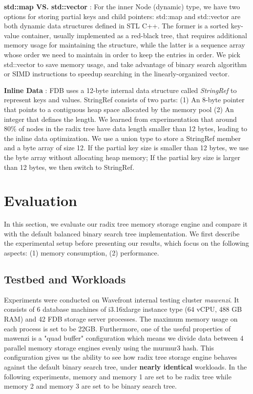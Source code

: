 \documentclass[sigplan,screen,nonacm]{acmart}
\begin{document}
\textbf {std::map VS. std::vector} : For the inner Node (dynamic) type, we have two options for storing partial keys and child pointers:  std::map and std::vector are both dynamic data structures defined in STL C++.  The former is a sorted key-value container, usually implemented as a red-black tree, that requires additional memory usage for maintaining the structure, while the latter is a sequence array whose order we need to maintain in order to keep the entries in order. We pick std::vector to save memory usage, and take advantage of binary search algorithm or SIMD instructions to speedup searching in the linearly-organized vector. 

\textbf {Inline Data} :  FDB uses a 12-byte internal data structure called {\itshape StringRef} to represent keys and values. StringRef consists of two parts: (1) An 8-byte pointer that points to a contiguous heap space allocated by the memory pool (2) An integer that defines the length. We learned from experimentation that around 80\% of nodes in the radix tree have data length smaller than 12 bytes, leading to the inline data optimization. We use a union type to store a StringRef member and a byte array of size 12. If the partial key size is smaller than 12 bytes, we use the byte array without allocating heap memory; If the partial key size is larger than 12 bytes, we then switch to StringRef. 

\section{Evaluation}
In this section, we evaluate our radix tree memory storage engine and compare it with the default balanced binary search tree implementation. We first describe the experimental setup before presenting our results, which focus on the following aspects: (1) memory consumption, (2) performance. 
 
\subsection{Testbed and Workloads}
Experiments were conducted on Wavefront internal testing cluster {\itshape mawenzi}. It consists of 6 database machines of i3.16xlarge instance type (64 vCPU, 488 GB RAM) and 42 FDB storage server processes. The maximum memory usage on each process is set to be 22GB. Furthermore, one of the useful properties of mawenzi is a "quad buffer" configuration which means we divide data between 4 parallel memory storage engines evenly using the murmur3 hash. This configuration gives us the ability to see how radix tree storage engine behaves against the default binary search tree, under \textbf {nearly identical} workloads. In the following experiments, memory and memory 1 are set to be radix tree while memory 2 and memory 3 are set to be binary search tree. 
\end{document}
